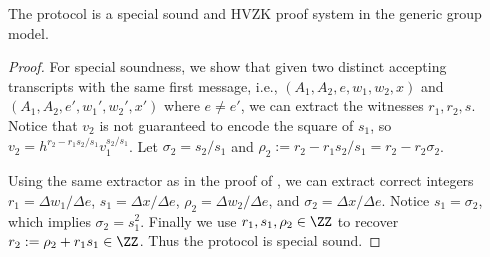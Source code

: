 \begin{theorem}[\zkposqs]\label{thm:posqs}
    The protocol \zkposqs is a special sound and HVZK proof system in the generic group model.
\end{theorem}
\begin{proof}
    For special soundness, we show that given two distinct accepting transcripts with the same first message, i.e., $(A_1, A_2, e, w_1,\allowbreak w_2, x)$ and $(A_1, A_2, e', w_1',\allowbreak w_2', x')$ where $e \neq e'$, we can extract the witnesses $r_1, r_2, s$. Notice that $v_2$ is not guaranteed to encode the square of $s_1$, so $v_2 = h^{r_2 - r_1 s_2/s_1} v_1^{s_2/s_1}$. Let $\sigma_2 = s_2/s_1$ and $\rho_2 := r_2 - r_1 s_2/s_1 = r_2 - r_2 \sigma_2$. 

    Using the same extractor as in the proof of , we can extract correct integers $r_1 = \Delta w_1 / \Delta e$, $s_1 = \Delta x/\Delta e$, $\rho_2 = \Delta w_2 / \Delta e$, and $\sigma_2 = \Delta x/\Delta e$. Notice $s_1 = \sigma_2$, which implies $\sigma_2 = s_1^2$. Finally we use $r_1, s_1, \rho_2 \in \ZZ$ to recover $r_2 := \rho_2 + r_1 s_1 \in \ZZ$. 
    Thus the protocol is special sound.
    
    

\end{proof}
